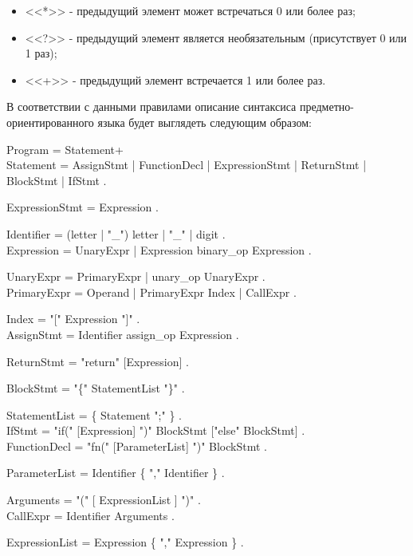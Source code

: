 \begin{itemize}
    \item <<*>> - предыдущий элемент может встречаться 0 или более раз;
    \item <<?>> - предыдущий элемент является необязательным (присутствует 0 или 1 раз);
    \item <<+>> - предыдущий элемент встречается 1 или более раз.
\end{itemize}

В соответствии с данными правилами описание синтаксиса предметно-ориентированного языка будет выглядеть следующим образом:

Program = Statement+ \\

Statement = AssignStmt | FunctionDecl | ExpressionStmt | ReturnStmt | BlockStmt | IfStmt .

ExpressionStmt = Expression .

Identifier = (letter | "{}\_"{}) { letter | "{}\_"{} | digit } . \\

Expression = UnaryExpr | Expression binary\_op Expression . 

UnaryExpr = PrimaryExpr | unary\_op UnaryExpr . \\

PrimaryExpr = Operand | PrimaryExpr Index | CallExpr .

Index = "{}["{} Expression "{}]"{} . \\

AssignStmt = Identifier assign\_op Expression .

ReturnStmt = "{}return"{} [Expression] .

BlockStmt = "{}\{"{} StatementList "{}\}" .

StatementList = \{ Statement "{};"{} \} . \\

IfStmt = "{}if("{} [Expression] "{})"{} BlockStmt ["{}else"{} BlockStmt] . \\

FunctionDecl = "{}fn("{} [ParameterList] "{})"{} BlockStmt .

ParameterList = Identifier \{ "{},"{} Identifier \} .

Arguments = "{}("{} [ ExpressionList ] "{})"{} . \\

CallExpr = Identifier Arguments .

ExpressionList = Expression \{ "{},"{} Expression \} . \\

